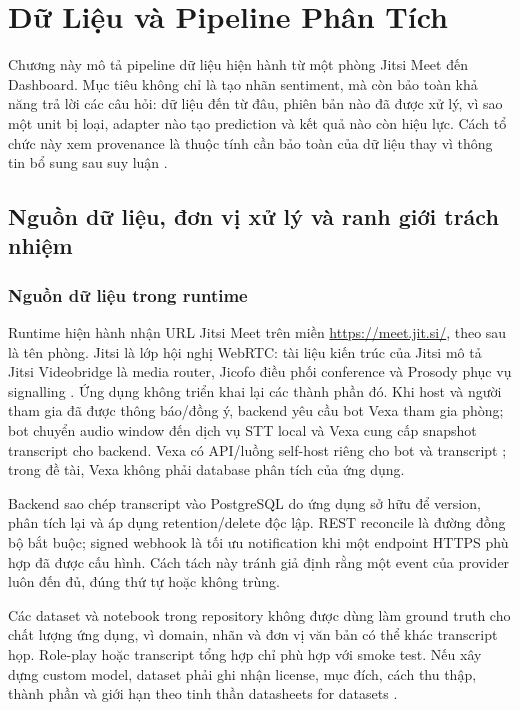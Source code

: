 \chapter{Dữ Liệu và Pipeline Phân Tích}
\label{chap:data}

Chương này mô tả pipeline dữ liệu hiện hành từ một phòng Jitsi Meet đến Dashboard. Mục tiêu không chỉ là tạo nhãn sentiment, mà còn bảo toàn khả năng trả lời các câu hỏi: dữ liệu đến từ đâu, phiên bản nào đã được xử lý, vì sao một unit bị loại, adapter nào tạo prediction và kết quả nào còn hiệu lực. Cách tổ chức này xem provenance là thuộc tính cần bảo toàn của dữ liệu thay vì thông tin bổ sung sau suy luận \cite{buneman2001}.

\section{Nguồn dữ liệu, đơn vị xử lý và ranh giới trách nhiệm}
\subsection{Nguồn dữ liệu trong runtime}
Runtime hiện hành nhận URL Jitsi Meet trên miền \url{https://meet.jit.si/}, theo sau là tên phòng. Jitsi là lớp hội nghị WebRTC: tài liệu kiến trúc của Jitsi mô tả Jitsi Videobridge là media router, Jicofo điều phối conference và Prosody phục vụ signalling \cite{jitsiArchitecture2026}. Ứng dụng không triển khai lại các thành phần đó. Khi host và người tham gia đã được thông báo/đồng ý, backend yêu cầu bot Vexa tham gia phòng; bot chuyển audio window đến dịch vụ STT local và Vexa cung cấp snapshot transcript cho backend. Vexa có API/luồng self-host riêng cho bot và transcript \cite{vexaQuickstart2026}; trong đề tài, Vexa không phải database phân tích của ứng dụng.

Backend sao chép transcript vào PostgreSQL do ứng dụng sở hữu để version, phân tích lại và áp dụng retention/delete độc lập. REST reconcile là đường đồng bộ bắt buộc; signed webhook là tối ưu notification khi một endpoint HTTPS phù hợp đã được cấu hình. Cách tách này tránh giả định rằng một event của provider luôn đến đủ, đúng thứ tự hoặc không trùng.

Các dataset và notebook trong repository không được dùng làm ground truth cho chất lượng ứng dụng, vì domain, nhãn và đơn vị văn bản có thể khác transcript họp. Role-play hoặc transcript tổng hợp chỉ phù hợp với smoke test. Nếu xây dựng custom model, dataset phải ghi nhận license, mục đích, cách thu thập, thành phần và giới hạn theo tinh thần datasheets for datasets \cite{gebru2021}.

